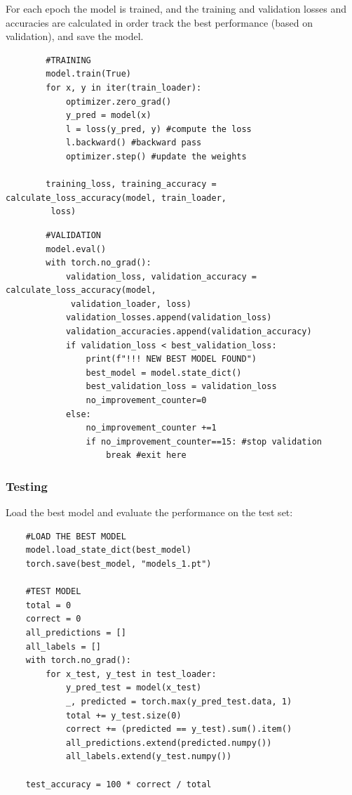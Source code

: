 \documentclass[12pt, a4paper, italian]{scrartcl}
\begin{document}
For each epoch the model is trained, and the training and validation losses and accuracies are calculated in order track the best performance (based on validation), and save the model.

\begin{verbatim} 
 		#TRAINING
        model.train(True)
        for x, y in iter(train_loader):
            optimizer.zero_grad()
            y_pred = model(x)
            l = loss(y_pred, y) #compute the loss
            l.backward() #backward pass
            optimizer.step() #update the weights

        training_loss, training_accuracy = calculate_loss_accuracy(model, train_loader,
         loss)
\end{verbatim}
\begin{verbatim} 
        #VALIDATION
        model.eval()
        with torch.no_grad():
            validation_loss, validation_accuracy = calculate_loss_accuracy(model,
             validation_loader, loss)
            validation_losses.append(validation_loss)
            validation_accuracies.append(validation_accuracy)
            if validation_loss < best_validation_loss:
                print(f"!!! NEW BEST MODEL FOUND")
                best_model = model.state_dict()
                best_validation_loss = validation_loss
                no_improvement_counter=0
            else:
                no_improvement_counter +=1
                if no_improvement_counter==15: #stop validation 
                    break #exit here
\end{verbatim}
    \newpage
  \subsubsection{Testing}
  Load the best model and evaluate the performance on the test set:
  
  \begin{verbatim} 
    #LOAD THE BEST MODEL
    model.load_state_dict(best_model)
    torch.save(best_model, "models_1.pt")
    
    #TEST MODEL
    total = 0
    correct = 0
    all_predictions = []
    all_labels = []
    with torch.no_grad():
        for x_test, y_test in test_loader:
            y_pred_test = model(x_test)
            _, predicted = torch.max(y_pred_test.data, 1)
            total += y_test.size(0)
            correct += (predicted == y_test).sum().item()
            all_predictions.extend(predicted.numpy())
            all_labels.extend(y_test.numpy())

    test_accuracy = 100 * correct / total
\end{verbatim}
\end{document}
